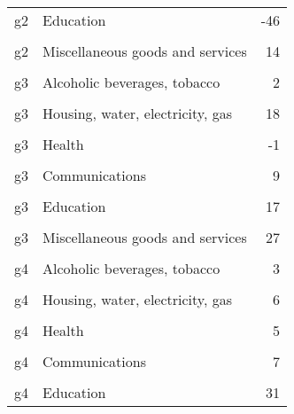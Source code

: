 \documentclass[10pt,a4paper]{report}
\begin{document}
\begin{table}
{\begin{tabular}[t]{llr}
g2 & Education & -46\\
\cellcolor{gray!10}{g2} & \cellcolor{gray!10}{Restaurants and hotels} & \cellcolor{gray!10}{22}\\
g2 & Miscellaneous goods and services & 14\\
\cellcolor{gray!10}{g3} & \cellcolor{gray!10}{Food and non-alcoholic beverages} & \cellcolor{gray!10}{24}\\
\addlinespace
g3 & Alcoholic beverages, tobacco & 2\\
\cellcolor{gray!10}{g3} & \cellcolor{gray!10}{Clothing and footwear} & \cellcolor{gray!10}{13}\\
g3 & Housing, water, electricity, gas & 18\\
\cellcolor{gray!10}{g3} & \cellcolor{gray!10}{Furniture, household goods} & \cellcolor{gray!10}{17}\\
g3 & Health & -1\\
\addlinespace
\cellcolor{gray!10}{g3} & \cellcolor{gray!10}{Transport} & \cellcolor{gray!10}{42}\\
g3 & Communications & 9\\
\cellcolor{gray!10}{g3} & \cellcolor{gray!10}{Recreation and culture} & \cellcolor{gray!10}{22}\\
g3 & Education & 17\\
\cellcolor{gray!10}{g3} & \cellcolor{gray!10}{Restaurants and hotels} & \cellcolor{gray!10}{18}\\
\addlinespace
g3 & Miscellaneous goods and services & 27\\
\cellcolor{gray!10}{g4} & \cellcolor{gray!10}{Food and non-alcoholic beverages} & \cellcolor{gray!10}{30}\\
g4 & Alcoholic beverages, tobacco & 3\\
\cellcolor{gray!10}{g4} & \cellcolor{gray!10}{Clothing and footwear} & \cellcolor{gray!10}{0}\\
g4 & Housing, water, electricity, gas & 6\\
\addlinespace
\cellcolor{gray!10}{g4} & \cellcolor{gray!10}{Furniture, household goods} & \cellcolor{gray!10}{-4}\\
g4 & Health & 5\\
\cellcolor{gray!10}{g4} & \cellcolor{gray!10}{Transport} & \cellcolor{gray!10}{2}\\
g4 & Communications & 7\\
\cellcolor{gray!10}{g4} & \cellcolor{gray!10}{Recreation and culture} & \cellcolor{gray!10}{-2}\\
\addlinespace
g4 & Education & 31\\

\end{tabular}}
\end{table}
\end{document}
